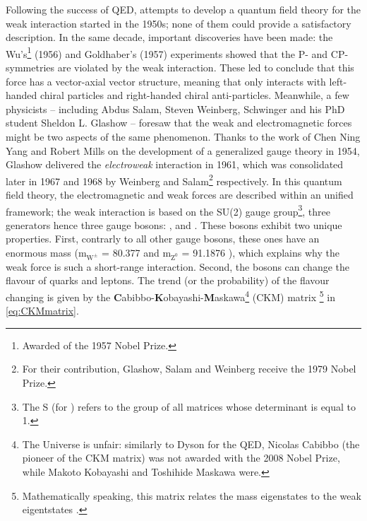 Following the success of QED, attempts to develop a quantum field theory for the weak interaction started in the 1950s; none of them could provide a satisfactory description. In the same decade, important discoveries have been made: the Wu's\footnote{Awarded of the 1957 Nobel Prize.} (1956) and Goldhaber's (1957) experiments \cite{wuExperimentalTestParity1957}\cite{goldhaberHelicityNeutrinos1958} showed that the P- and CP-symmetries are violated by the weak interaction. These led to conclude that this force has a vector-axial vector structure, meaning that only interacts with left-handed chiral particles and right-handed chiral anti-particles. Meanwhile, a few physicists -- including Abdus Salam, Steven Weinberg, Schwinger and his PhD student Sheldon L. Glashow -- foresaw that the weak and electromagnetic forces might be two aspects of the same phenomenon. Thanks to the work of Chen Ning Yang and Robert Mills on the development of a generalized gauge theory in 1954, Glashow delivered the \emph{electroweak} interaction in 1961, which was consolidated later in 1967 and 1968 by Weinberg and Salam\footnote{For their contribution, Glashow, Salam and Weinberg receive the 1979 Nobel Prize.} respectively. In this quantum field theory, the electromagnetic and weak forces are described within an unified framework; the weak interaction is based on the SU(2) gauge group\footnote{The S (for ) refers to the group of all matrices whose determinant is equal to 1.}, three generators hence three gauge bosons: \rmWplus, \rmWminus and \rmZzero. These bosons exhibit two unique properties.  First, contrarly to all other gauge bosons, these ones have an enormous mass (m$_{\textrm{W}^{\pm}}$ = 80.377 \gmass and m$_{\textrm{Z}^{0}}$ = 91.1876 \gmass \cite{particledatagroupReviewParticlePhysics2022}), which explains why the weak force is such a short-range interaction. Second, the \rmWplusminus bosons can change the flavour of quarks and leptons. The trend (or the probability) of the flavour changing is given by the \textbf{C}abibbo-\textbf{K}obayashi-\textbf{M}askawa\footnote{The Universe is unfair: similarly to Dyson for the QED, Nicolas Cabibbo (the pioneer of the CKM matrix) was not awarded with the 2008 Nobel Prize, while Makoto Kobayashi and Toshihide Maskawa were.} (CKM) matrix \cite{particledatagroupReviewParticlePhysics2022}\footnote{Mathematically speaking, this matrix relates the mass eigenstates to the weak eigentstates \cite{thomsonModernParticlePhysics2013}.} in \eq\ref{eq:CKMmatrix}.


